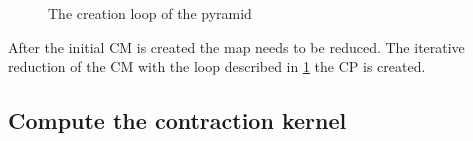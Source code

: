 \documentclass[12pt]{article}
\begin{document}
\begin{figure}[tb]
\centering
{}
\caption{The creation loop of the pyramid}%
\label{fig:creation loop}
\end{figure}

After the initial CM is created the map needs to be reduced. The iterative reduction of the CM with the loop described in \cref{fig:creation loop} the CP is created.

\subsection{Compute the contraction kernel} %
\label{sub:compute_the_contraction_kernel}
\end{document}
